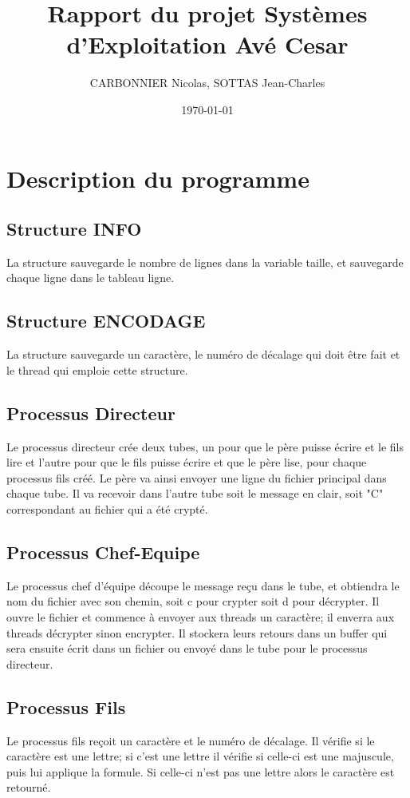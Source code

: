 \documentclass[a4]{article}
\author{CARBONNIER Nicolas, SOTTAS Jean-Charles }
\title{Rapport du projet Systèmes d'Exploitation Avé Cesar}
\date{\today}
\begin{document}
\maketitle
\section{Description du programme}
\subsection{Structure INFO}
La structure sauvegarde le nombre de lignes dans la variable taille, et sauvegarde chaque ligne dans le tableau ligne.
\subsection{Structure ENCODAGE}
La structure sauvegarde un caractère, le numéro de décalage qui doit être fait et le thread qui emploie cette structure.
\subsection{Processus Directeur}
Le processus directeur crée deux tubes, un pour que le père puisse écrire et le fils lire et l'autre pour que le fils puisse écrire et que le père lise, pour chaque processus fils créé. Le père va ainsi envoyer une ligne du fichier principal dans chaque tube. Il va recevoir dans l'autre tube soit le message en clair, soit "C" correspondant au fichier qui a été crypté. 
\subsection{Processus Chef-Equipe}
Le processus chef d'équipe découpe le message re\c cu dans le tube, et obtiendra le nom du fichier avec son chemin, soit c pour crypter soit d pour décrypter. Il ouvre le fichier et commence à envoyer aux threads un caractère; il enverra aux threads décrypter sinon encrypter. Il stockera leurs retours dans un buffer qui sera ensuite écrit dans un fichier ou envoyé dans le tube pour le processus directeur.
\subsection{Processus Fils}
Le processus fils re\c coit un caractère et le numéro de décalage. Il vérifie si le caractère est une lettre; si c'est une lettre il vérifie si celle-ci est une majuscule, puis lui applique la formule. Si celle-ci n'est pas une lettre alors le caractère est retourné.
\end{document}
